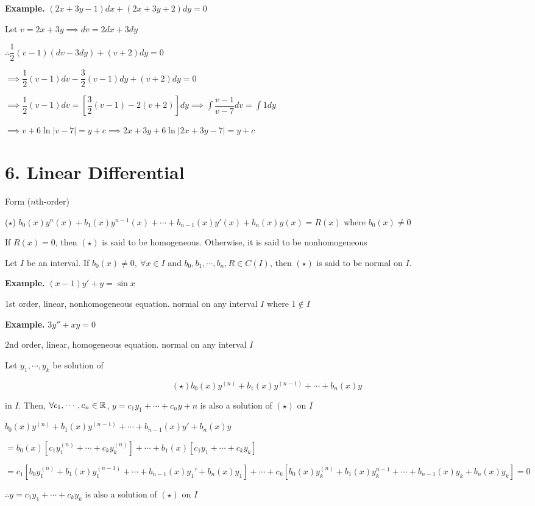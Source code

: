 \textbf{Example.} $(2x + 3y - 1)dx + (2x + 3y + 2)dy = 0$

Let $v = 2x + 3y \implies dv = 2dx + 3dy$

$\therefore \dfrac{1}{2}(v-1)(dv - 3dy) + (v + 2)dy = 0$

$\implies \dfrac{1}{2}(v-1)dv - \dfrac{3}{2}(v-1)dy + (v+2)dy = 0$

$\implies \dfrac{1}{2} (v-1)dv = [\dfrac{3}{2}(v-1) - 2(v+2)]dy \implies \int \dfrac{v-1}{v-7}dv = \int 1 dy$

$\implies v + 6 \ln |v - 7| = y + c \implies 2x+3y + 6\ln |2x+3y -7| = y+c$

\newpage

\section*{6. Linear Differential}

Form ($n$th-order)

($\star$) $b_0(x)y^n(x) + b_1(x)y^{n-1}(x) + \cdots + b_{n-1}(x)y'(x) + b_n(x)y(x) = R(x)$ where $b_0(x) \neq 0$

\begin{defn}
	If $R(x) = 0$, then $(\star)$ is said to be homogeneous. Otherwise, it is said to be nonhomogeneous
\end{defn}

\begin{defn}
	Let $I$ be an interval. If $b_0(x) \neq 0,~\forall x \in I$ and $b_0,b_1,\cdots,b_n,R \in C(I)$, then $(\star)$ is said to be normal on $I$.
\end{defn}

\textbf{Example.} $(x - 1)y' + y = \sin x$

$1$st order, linear, nonhomogeneous equation. normal on any interval $I$ where $1 \notin I$

\textbf{Example.} $3y'' + xy = 0$

$2$nd order, linear, homogeneous equation. normal on any interval $I$

\begin{thm*}
		Let $y_1,\cdots,y_k$ be solution of
		
		$$(\star) b_0 (x)y^{(n)} + b_1(x)y^{(n-1)} + \cdots + b_n (x)y$$
		
		in $I$. Then, $\forall c_1,\cdots,c_n \in \mathbb{R}$, $y = c_1y_1 + \cdots + c_n y+n$ is also a solution of $(\star)$ on $I$
\end{thm*}

\begin{solution}
	$b_0(x)y^{(n)} + b_1(x)y^{(n-1)} + \cdots + b_{n-1}(x)y' + b_n(x)y$
	
	$ = b_0(x)[c_1y_1^{(n)} + \cdots + c_ky_k^{(n)}] + \cdots + b_1(x)[c_1y_1 + \cdots + c_ky_k]$
	
	$ = c_1[b_0y_1^{(n)} + b_1(x)y_1^{(n-1)} + \cdots + b_{n-1}(x)y_1' + b_n(x)y_1] + \cdots + c_k [b_0(x)y_k^{(n)} + b_1(x)y_k^{n-1} + \cdots + b_{n-1}(x)y_k + b_n(x)y_k] = 0$
	
	$\therefore y= c_1y_1+\cdots + c_ky_k$ is also a solution of $(\star)$ on $I$
\end{solution}

